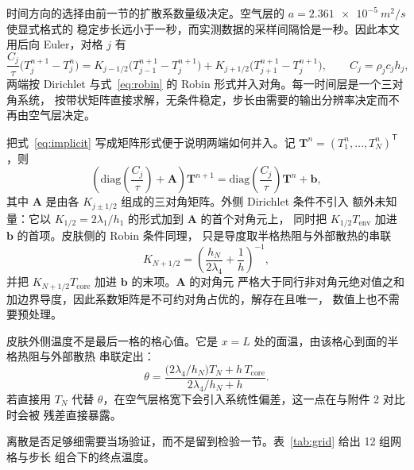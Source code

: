 \documentclass[withoutpreface,bwprint]{cumcmthesis}
\begin{document}
时间方向的选择由前一节的扩散系数量级决定。空气层的 $a=\SI{2.361e-5}{m^2/s}$ 使显式格式的
稳定步长远小于一秒，而实测数据的采样间隔恰是一秒。因此本文用后向 Euler，对格 $j$ 有
\begin{equation}
  \frac{C_j}{\tau}\bigl(T_j^{n+1}-T_j^{n}\bigr)
  = K_{j-1/2}\bigl(T_{j-1}^{n+1}-T_j^{n+1}\bigr)
  + K_{j+1/2}\bigl(T_{j+1}^{n+1}-T_j^{n+1}\bigr),
  \qquad C_j=\rho_j c_j h_j,
  \label{eq:implicit}
\end{equation}
两端按 Dirichlet 与式~\eqref{eq:robin} 的 Robin 形式并入对角。每一时间层是一个三对角系统，
按带状矩阵直接求解，无条件稳定，步长由需要的输出分辨率决定而不再由空气层决定。

把式~\eqref{eq:implicit} 写成矩阵形式便于说明两端如何并入。记
$\boldsymbol{T}^{n}=(T_1^n,\dots,T_N^n)^{\mathsf T}$，则
\begin{equation}
  \left(\mathrm{diag}\!\left(\frac{C_j}{\tau}\right)+\boldsymbol{A}\right)\boldsymbol{T}^{n+1}
  = \mathrm{diag}\!\left(\frac{C_j}{\tau}\right)\boldsymbol{T}^{n}+\boldsymbol{b},
  \label{eq:matrix}
\end{equation}
其中 $\boldsymbol{A}$ 是由各 $K_{j\pm1/2}$ 组成的三对角矩阵。外侧 Dirichlet 条件不引入
额外未知量：它以 $K_{1/2}=2\lambda_1/h_1$ 的形式加到 $\boldsymbol{A}$ 的首个对角元上，
同时把 $K_{1/2}T_{\mathrm{env}}$ 加进 $\boldsymbol{b}$ 的首项。皮肤侧的 Robin 条件同理，
只是导度取半格热阻与外部散热的串联
\begin{equation}
  K_{N+1/2}=\left(\frac{h_N}{2\lambda_4}+\frac{1}{h}\right)^{-1},
  \label{eq:robindisc}
\end{equation}
并把 $K_{N+1/2}T_{\mathrm{core}}$ 加进 $\boldsymbol{b}$ 的末项。$\boldsymbol{A}$ 的对角元
严格大于同行非对角元绝对值之和加边界导度，因此系数矩阵是不可约对角占优的，解存在且唯一，
数值上也不需要预处理。

皮肤外侧温度不是最后一格的格心值。它是 $x=L$ 处的面温，由该格心到面的半格热阻与外部散热
串联定出：
\begin{equation}
  \theta = \frac{\bigl(2\lambda_4/h_N\bigr)T_N + h\,T_{\mathrm{core}}}
                {2\lambda_4/h_N + h}.
  \label{eq:face}
\end{equation}
若直接用 $T_N$ 代替 $\theta$，在空气层格宽下会引入系统性偏差，这一点在与附件 2 对比时会被
残差直接暴露。

离散是否足够细需要当场验证，而不是留到检验一节。表~\ref{tab:grid} 给出 12 组网格与步长
组合下的终点温度。

\begin{table}[htbp]
  \centering
  \caption{网格与时间步长组合下的终点温度（附件 2 条件）}
  \label{tab:grid}
  
\end{table}
\end{document}
